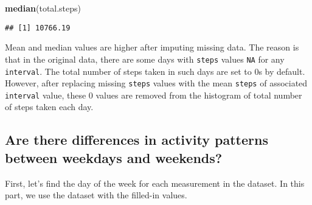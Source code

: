 \documentclass[
]{article}
\newenvironment{Shaded}{\begin{snugshade}}{\end{snugshade}}
\newcommand{\ControlFlowTok}[1]{\textcolor[rgb]{0.13,0.29,0.53}{\textbf{#1}}}
\newcommand{\DataTypeTok}[1]{\textcolor[rgb]{0.13,0.29,0.53}{#1}}
\newcommand{\KeywordTok}[1]{\textcolor[rgb]{0.13,0.29,0.53}{\textbf{#1}}}
\newcommand{\NormalTok}[1]{#1}
\newcommand{\OperatorTok}[1]{\textcolor[rgb]{0.81,0.36,0.00}{\textbf{#1}}}
\newcommand{\StringTok}[1]{\textcolor[rgb]{0.31,0.60,0.02}{#1}}
\begin{document}
\begin{Shaded}
\begin{Highlighting}[]
\KeywordTok{median}\NormalTok{(total.steps)}
\end{Highlighting}
\end{Shaded}

\begin{verbatim}
## [1] 10766.19
\end{verbatim}

Mean and median values are higher after imputing missing data. The
reason is that in the original data, there are some days with
\texttt{steps} values \texttt{NA} for any \texttt{interval}. The total
number of steps taken in such days are set to 0s by default. However,
after replacing missing \texttt{steps} values with the mean
\texttt{steps} of associated \texttt{interval} value, these 0 values are
removed from the histogram of total number of steps taken each day.

\hypertarget{are-there-differences-in-activity-patterns-between-weekdays-and-weekends}{%
\subsection{Are there differences in activity patterns between weekdays
and
weekends?}\label{are-there-differences-in-activity-patterns-between-weekdays-and-weekends}}

First, let's find the day of the week for each measurement in the
dataset. In this part, we use the dataset with the filled-in values.

\begin{Shaded}
\end{Shaded}
\end{document}
